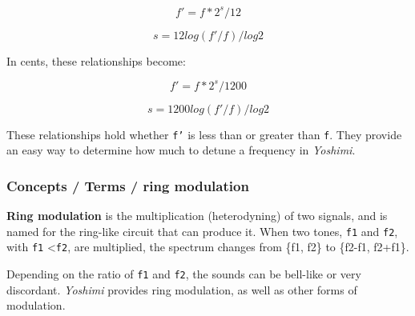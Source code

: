   \[f' = f * 2^s/12\]

   \[s = 12 log (f'/f) / log 2\]

   In cents, these relationships become:

   \[f' = f * 2^s/1200\]

   \[s = 1200 log (f'/f) / log 2\]

   These relationships hold whether \texttt{f'} is less than or greater than
   \texttt{f}.  They provide an easy way to determine how much to detune a
   frequency in \textsl{Yoshimi}.

\subsubsection{Concepts / Terms / ring modulation}
\label{subsubsec:concepts_terms_ring_mod}

   \textbf{Ring modulation}
   is the multiplication (heterodyning) of two signals, and is named for the
   ring-like circuit that can produce it.
   When two tones, \texttt{f1} and \texttt{f2}, with 
   \texttt{f1} \textless \texttt{f2}, are multiplied, the spectrum
   changes from \{f1, f2\} to \{f2-f1, f2+f1\}.

   Depending on the ratio of \texttt{f1} and \texttt{f2}, the
   sounds can be bell-like or very discordant.
   \textsl{Yoshimi} provides ring modulation, as well as other forms of
   modulation.

